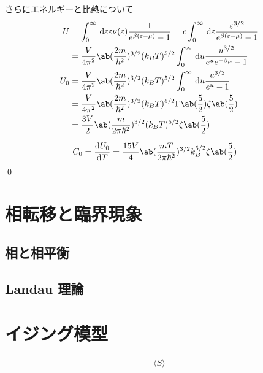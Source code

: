 \documentclass[uplatex,diffipdfmx,a4paper,11pt]{jlreq}
\makeatletter
\numberwithin{equation}{section}
\theoremstyle{definition}
\renewenvironment{proof}[1][\proofname]{\par
  \normalfont
  \topsep6\p@\@plus6\p@ \trivlist
  \item[\hskip\labelsep{\bfseries #1}\@addpunct{\bfseries}]\ignorespaces\quad\par
}{%
  \qed\endtrivlist\@endpefalse
}
\renewcommand\proofname{証明}
\makeatother
\begin{document}
\begin{proof}
  さらにエネルギーと比熱について
  \begin{align}
    U   & = \int_{0}^{\infty}\dl{\varepsilon}\varepsilon\nu(\varepsilon)\frac{1}{e^{\beta(\varepsilon - \mu)} - 1} = c\int_{0}^{\infty}\dl{\varepsilon}\frac{\varepsilon^{3/2}}{e^{\beta(\varepsilon - \mu)} - 1} \\
        & = \frac{V}{4\pi^2}\ab(\frac{2m}{\hbar^2})^{3/2}(k_BT)^{5/2}\int_{0}^{\infty}\dl{u}\frac{u^{3/2}}{e^ue^{-\beta\mu} - 1}                                                                                  \\
    U_0 & = \frac{V}{4\pi^2}\ab(\frac{2m}{\hbar^2})^{3/2}(k_BT)^{5/2}\int_{0}^{\infty}\dl{u}\frac{u^{3/2}}{e^u - 1}                                                                                               \\
        & = \frac{V}{4\pi^2}\ab(\frac{2m}{\hbar^2})^{3/2}(k_BT)^{5/2}\Gamma\ab(\frac{5}{2})\zeta\ab(\frac{5}{2})                                                                                                  \\
        & = \frac{3V}{2}\ab(\frac{m}{2\pi\hbar^2})^{3/2}(k_BT)^{5/2}\zeta\ab(\frac{5}{2})
  \end{align}

  \begin{align}
    C_0 & = \diff{U_0}{T} = \frac{15V}{4}\ab(\frac{mT}{2\pi\hbar^2})^{3/2}k_B^{5/2}\zeta\ab(\frac{5}{2})
  \end{align}
\end{proof}

\section{相転移と臨界現象}
\subsection{相と相平衡}
\subsection{Landau 理論}

\section{イジング模型}

\begin{align}
  \langle S\rangle
\end{align}
\end{document}
